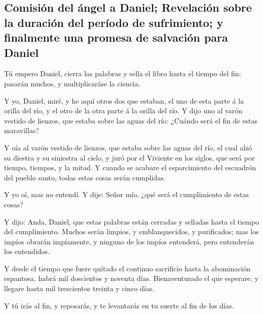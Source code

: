 \hypertarget{comisiuxf3n-del-uxe1ngel-a-daniel-revelaciuxf3n-sobre-la-duraciuxf3n-del-peruxedodo-de-sufrimiento-y-finalmente-una-promesa-de-salvaciuxf3n-para-daniel}{%
\subsection{Comisión del ángel a Daniel; Revelación sobre la duración
del período de sufrimiento; y finalmente una promesa de salvación para
Daniel}\label{comisiuxf3n-del-uxe1ngel-a-daniel-revelaciuxf3n-sobre-la-duraciuxf3n-del-peruxedodo-de-sufrimiento-y-finalmente-una-promesa-de-salvaciuxf3n-para-daniel}}

 Tú empero Daniel, cierra las palabras y sella el libro
hasta el tiempo del fin: pasarán muchos, y multiplicaráse la ciencia.

 Y yo, Daniel, miré, y he aquí otros dos que estaban, el
uno de esta parte á la orilla del río, y el otro de la otra parte á la
orilla del río.  Y dijo uno al varón vestido de lienzos,
que estaba sobre las aguas del río: ¿Cuándo será el fin de estas
maravillas?

 Y oía al varón vestido de lienzos, que estaba sobre las
aguas del río, el cual alzó su diestra y su siniestra al cielo, y juró
por el Viviente en los siglos, que será por tiempo, tiempos, y la mitad.
Y cuando se acabare el esparcimiento del escuadrón del pueblo santo,
todas estas cosas serán cumplidas.

 Y yo oí, mas no entendí. Y dije: Señor mío, ¿qué será el
cumplimiento de estas cosas?

 Y dijo: Anda, Daniel, que estas palabras están cerradas y
selladas hasta el tiempo del cumplimiento.  Muchos serán
limpios, y emblanquecidos, y purificados; mas los impíos obrarán
impíamente, y ninguno de los impíos entenderá, pero entenderán los
entendidos.

 Y desde el tiempo que fuere quitado el continuo
sacrificio hasta la abominación espantosa, habrá mil doscientos y
noventa días.  Bienaventurado el que esperare, y llegare
hasta mil trescientos treinta y cinco días.

 Y tú irás al fin, y reposarás, y te levantarás en tu
suerte al fin de los días.
